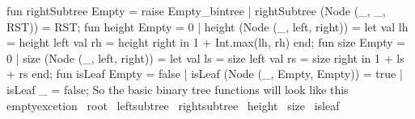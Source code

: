 \documentclass[10pt,a4paper]{article}%
\begin{document}
fun rightSubtree Empty = raise Empty_bintree
        | rightSubtree (Node (_, _, RST)) = RST;
\nwendcode{}\nwdocspar
\nwenddocs{}\endmoddef\nwstartdeflinemarkup{}\nwenddeflinemarkup
fun height Empty = 0
        | height (Node (_, left, right)) =
                let
                        val lh = height left
                        val rh = height right
                in 1 + Int.max(lh, rh)
                end;
\nwendcode{}\nwdocspar
\nwenddocs{}\endmoddef\nwstartdeflinemarkup{}\nwenddeflinemarkup
fun size Empty = 0
        | size (Node (_, left, right)) =
                let
                        val ls = size left
                        val rs = size right
                in 1 + ls + rs
                end;
\nwendcode{}\nwdocspar
\nwenddocs{}\endmoddef\nwstartdeflinemarkup{}\nwenddeflinemarkup
fun isLeaf Empty = false
        | isLeaf (Node (_, Empty, Empty)) = true
        | isLeaf _ = false;
\nwendcode{}\nwdocspar
So the basic binary tree functions will look like this \\

\nwenddocs{}\endmoddef\nwstartdeflinemarkup{}\nwenddeflinemarkup
\LA{}emptyexcetion~{\nwtagstyle{}}\RA{}
\LA{}root~{\nwtagstyle{}}\RA{}
\LA{}leftsubtree~{\nwtagstyle{}}\RA{}
\LA{}rightsubtree~{\nwtagstyle{}}\RA{}
\LA{}height~{\nwtagstyle{}}\RA{}
\LA{}size~{\nwtagstyle{}}\RA{}
\LA{}isleaf~{\nwtagstyle{}}\RA{}
\nwendcode{}\nwdocspar
\end{document}
